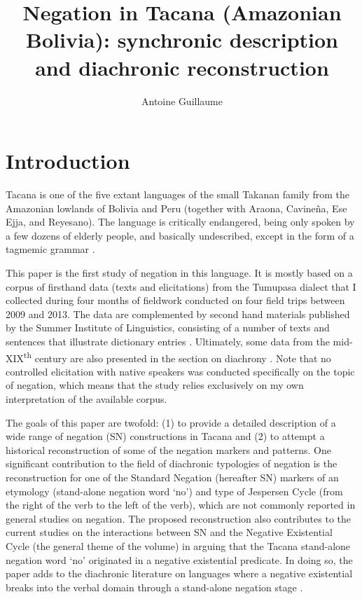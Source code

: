 \documentclass[output=paper]{langsci/langscibook}
\author{Antoine Guillaume\affiliation{Laboratoire Dynamique du Langage (CNRS \& Université de Lyon)}}
\title{Negation in Tacana (Amazonian Bolivia): synchronic description and diachronic reconstruction}
\begin{document}
\maketitle

\section{Introduction}

Tacana %
is one of the five extant languages of the small Takanan family from
the Amazonian lowlands of Bolivia and Peru (together with Araona, Cavineña, Ese Ejja, and Reyesano). The language is critically endangered, being
only spoken by a few dozens of elderly people, and basically undescribed,
except in the form of a tagmemic grammar \parencites{Ottaviano1965}{Ottaviano1967}.

This paper is the first study of negation in this language. It is mostly
based on a corpus of firsthand data (texts and elicitations) from the Tumupasa
dialect that I collected during four months of fieldwork conducted on
four field trips between 2009 and 2013. The data are complemented by second
hand materials published by the Summer Institute of Linguistics, consisting
of a number of texts \citep{Ottaviano1980} and sentences that illustrate
dictionary entries \parencites{Ottaviano1989}. Ultimately,
some data from the mid-XIX\textsuperscript{th} century are also presented
in the section on diachrony \parencites{LafoneQuevedo1902}. Note that no
controlled elicitation with native speakers was conducted specifically on
the topic of negation, which means that the study relies exclusively on my
own interpretation of the available corpus.

The goals of this paper are twofold: (1) to provide a detailed
description of a wide range of negation (SN) constructions in Tacana and
(2) to attempt a historical reconstruction of some of the negation
markers and patterns. One significant contribution to the field of
diachronic typologies of negation is the reconstruction for one of the
Standard Negation (hereafter SN) markers of an etymology (stand-alone
negation word `no') and type of Jespersen Cycle (from the right of the verb
to the left of the verb), which are not commonly reported in general
studies on negation.  The proposed reconstruction also contributes to the
current studies on the interactions between SN and the Negative Existential
Cycle (the general theme of the volume) in arguing that the Tacana
stand-alone negation word `no' originated in a negative existential
predicate. In doing so, the paper adds to the diachronic literature on
languages where a negative existential breaks into the verbal domain
through a stand-alone negation stage
\parencites[10, 13--14]{Croft1991}[127ff]{Veselinova2013}[155--156]{Veselinova2016}.
\end{document}
